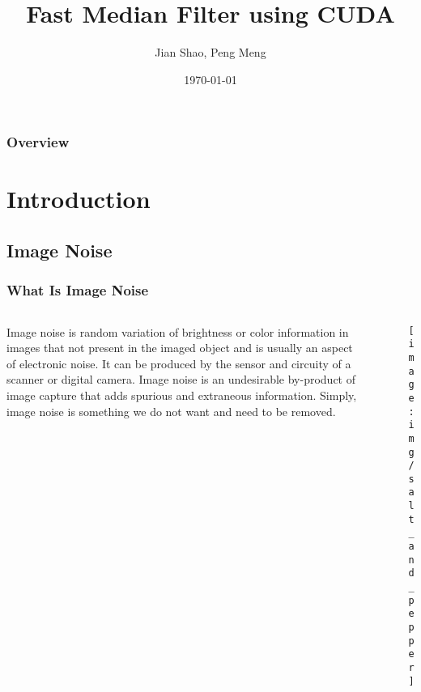 \documentclass{beamer}
\title[Short title]{Fast Median Filter using CUDA} %
\author{Jian Shao, Peng Meng} %
\institute[Northwestern U] %
{
Northwestern University \\ %
\medskip
}
\date{\today} %
\begin{document}
\begin{frame}
\titlepage %
\end{frame}

\begin{frame}
\frametitle{Overview} %
\tableofcontents %
\end{frame}


\section{Introduction} %

\subsection{Image Noise} %

\begin{frame}
\frametitle{What Is Image Noise}
\begin{columns}
        \begin{column}{.5\textwidth}
		Image noise is random variation of brightness or color information in images that not present in the imaged object and is usually an aspect of electronic noise. It can be produced by the sensor and circuity of a scanner or digital camera. Image noise is an undesirable by-product of image capture that adds spurious and extraneous information. Simply, image noise is something we do not want and need to be removed.
        \end{column}
        \begin{column}{.5\textwidth}%
		\begin{figure}
	           	\texttt{[image: img/salt\_and\_pepper]}
		\end{figure}
        \end{column}
\end{columns}
\end{frame}
\end{document}
